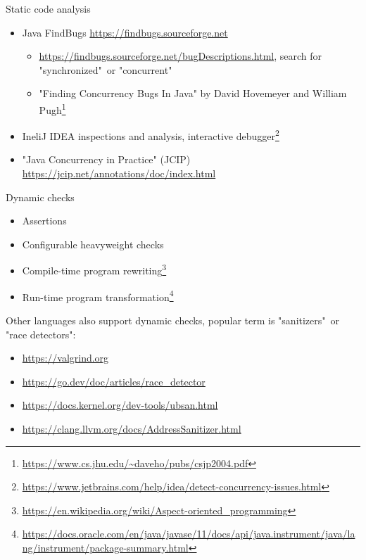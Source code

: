 \begin{frame}{Static code analysis}

\begin{itemize}
  \item Java FindBugs \url{https://findbugs.sourceforge.net}
  \begin{itemize}
    \item \url{https://findbugs.sourceforge.net/bugDescriptions.html}, search for "synchronized"\ or "concurrent"
    \item "Finding Concurrency Bugs In Java" by David Hovemeyer and William Pugh\footnote{\tiny\url{https://www.cs.jhu.edu/~daveho/pubs/csjp2004.pdf}}
  \end{itemize}

  \item IneliJ IDEA inspections and analysis, interactive debugger\footnote{\tiny\url{https://www.jetbrains.com/help/idea/detect-concurrency-issues.html}}

  \item "Java Concurrency in Practice" (JCIP) \url{https://jcip.net/annotations/doc/index.html}
\end{itemize}

\pause
\alarmSix
\end{frame}

\begin{frame}{Dynamic checks}

\begin{itemize}
  \item Assertions
  \item Configurable heavyweight checks  
  \item Compile-time program rewriting\footnote{\tiny\url{https://en.wikipedia.org/wiki/Aspect-oriented_programming}}
  \item Run-time program transformation\footnote{\tiny\url{https://docs.oracle.com/en/java/javase/11/docs/api/java.instrument/java/lang/instrument/package-summary.html}}
\end{itemize}

\pause
Other languages also support dynamic checks, popular term is "sanitizers"\ or "race detectors":
\begin{itemize}
  \item \url{https://valgrind.org}  
  \item \url{https://go.dev/doc/articles/race_detector}
  \item \url{https://docs.kernel.org/dev-tools/ubsan.html}
  \item \url{https://clang.llvm.org/docs/AddressSanitizer.html}
\end{itemize}
\end{frame}

